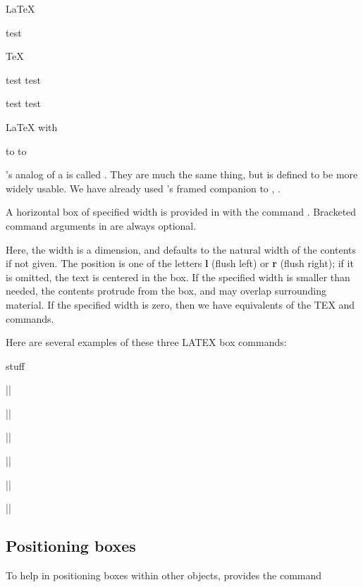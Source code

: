 {\begin{texexample}{}{}
\newbox\temp
\savebox{}
LaTeX

 \mbox{test}

TeX

\hbox{test} \hbox{test}

\indent\hbox{test} \hbox{test}

LaTeX with 

\makeatletter
\leavevmode\hbox to \wd{} \indent\hbox to \wd{}
\makeatother
\end{texexample}



\latex's analog of a is called . They are 
much the same thing, but  is defined to be more widely usable. We have already used \latex's framed companion to , .

A horizontal box of specified width is provided in \latex with the command
. Bracketed command arguments
in \latex are always optional. 

Here, the width is a \tex dimension,
and defaults to the natural width of the contents if not given. The position
is one of the letters \textbf{l} (flush left) or \textbf{r} (flush right); if it is omitted, the text
is centered in the box. If the specified width is smaller than needed, the
contents protrude from the box, and may overlap surrounding material. If
the specified width is zero, then we have equivalents of the TEX  and
 commands.


Here are several examples of these three LATEX box commands:

{\obeylines
\mbox{stuff}


||

||

||

||

||

||
}



\subsection{Positioning boxes}

To help in positioning boxes within other objects, \latex provides the command

}
